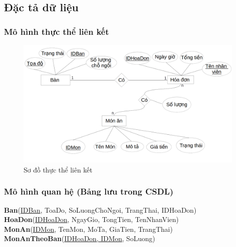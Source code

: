 \documentclass[a4paper,12pt]{report}
\begin{document}
\subsection{Đặc tả dữ liệu}
\subsubsection{Mô hình thực thể liên kết}
\begin{figure}[H]
\centering
\includegraphics[scale=0.4]{DuLieu.png}
\caption{Sơ đồ thực thể liên kết}
\end{figure}
\subsubsection{Mô hình quan hệ (Bảng lưu trong CSDL)}
\textbf{Ban}(\underline{IDBan}, ToaDo, SoLuongChoNgoi, TrangThai, IDHoaDon)\\
\textbf{HoaDon}(\underline{IDHoaDon}, NgayGio, TongTien, TenNhanVien)\\
\textbf{MonAn}(\underline{IDMon}, TenMon, MoTa, GiaTien, TrangThai)\\  
\textbf{MonAnTheoBan}(\underline{IDHoaDon, IDMon}, SoLuong) 
\end{document}
